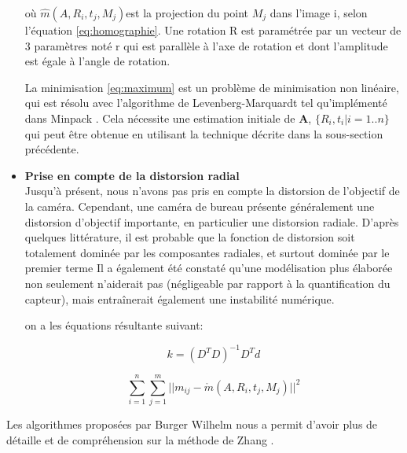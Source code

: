 \begin{itemize}[label={\Huge$\star$}]
 où $\hat{m}(A,R_{i},t_{j},M_{j})$est la projection du point $M_{j}$  dans l'image i, selon l'équation \ref{eq:homographie}. Une rotation R est paramétrée par un vecteur de 3 paramètres noté r qui est parallèle à l'axe de rotation et dont l'amplitude est égale à l'angle de rotation.  
 
 La minimisation  \ref{eq:maximum} est un problème de minimisation non 
 linéaire, qui est résolu avec l'algorithme de Levenberg-Marquardt tel 
 qu'implémenté dans Minpack \cite{watson_levenberg-marquardt_1978}. Cela nécessite une estimation initiale 
 de \textbf{A}, $\{R_i, t_i|i = 1..n\}$ qui peut être obtenue en utilisant la technique 
 décrite dans la sous-section précédente.\\
 
 \item \textbf{Prise en compte de la distorsion radial}
 \\
 
 Jusqu’à présent, nous n’avons pas pris en compte la distorsion de l’objectif 
  de la caméra. Cependant, une caméra de bureau présente généralement 
 une distorsion d'objectif importante, en particulier une distorsion radiale. 
  D'après quelques littérature, il est probable que la fonction de distorsion soit totalement dominée par les 
 composantes radiales, et surtout dominée par le premier terme Il a également été constaté qu'une modélisation plus élaborée non seulement n'aiderait pas (négligeable par rapport à la quantification du 
 capteur), mais entraînerait également une instabilité numérique.
 
 on a les équations résultante suivant:
 
 \begin{equation}
 	k
 	=
 	(D^{T}D)^{-1}D^{T}d
 	\label{eq:radial}
 \end{equation}	
 	
 	\begin{equation}
 		\sum_{i=1}^{n} \sum_{j=1}^{m} 
 		||m_{ij}-\mathring{m}
 		(A,R_{i},t_{j},M_{j})||^{2}
 		\label{eq:radial2}
 	\end{equation}
 	
 \end{itemize} 
 
 Les algorithmes proposées par Burger Wilhelm nous a permit d'avoir plus de détaille et de compréhension sur la méthode de Zhang \cite{burger_zhangs_2016}.
 


